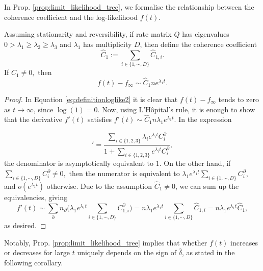 \begin{appendices}
In Prop. \ref{prop:limit_likelihood_tree},  we formalise the relationship between the coherence coefficient and the log-likelihood $f(t)$. 
 
  \begin{prop} \label{prop:limit_likelihood_tree}
Assuming stationarity and reversibility, if rate matrix $Q$ has eigenvalues $0 > \lambda_1 \geq \lambda_2 \geq \lambda_3$ and $\lambda_1$ has multiplicity $D$, then define the coherence coefficient \[\hat{C}_1 := \sum_{i \in \{1,\cdots, D\}} \hat{C}_{1,i}.\]
If $\hat{C}_1 \neq 0,$ then \[f(t) - f_\infty \sim \hat{C}_1 n e^{\lambda_1 t}.\]
\end{prop}
\begin{proof} \hfill
 \begin{sloppypar}
 In Equation \ref{eq:definitionloglike2} it is clear that $f(t) - f_\infty$ tends to zero as $t \to \infty$, since $\log(1) = 0$. Now, using L'H\^{o}pital's rule, it is enough to show that the derivative $f'(t)$ satisfies ${f'(t) \sim 
     \hat{C}_1 n \lambda_1  e^{\lambda_1 t}}$. In the expression
 \end{sloppypar}
 \begin{equation*}
     [\log \Big(1 +  \sum_{i \in \{ 1,2,3\}} e^{\lambda_i t} C_i^\partial \Big)]' = \frac{  \sum_{i \in \{ 1,2,3\}} \lambda_i e^{\lambda_it} C_i^\partial }{1 + \sum_{i \in \{ 1,2,3\}} e^{\lambda_it} C_i^\partial},
 \end{equation*}
 the denominator is asymptotically equivalent to $1$. On the other hand, if ${\sum_{i \in \{1,\cdots, D\}}C_i^\partial \neq 0,}$ then the numerator is equivalent to ${\lambda_1e^{\lambda_1t}\sum_{i \in \{1,\cdots, D\}}C_i^\partial}$, and $o(e^{\lambda_1t})$ otherwise. Due to the assumption $\hat{C}_1 \neq 0$, we can sum up the equivalencies, giving
\begin{equation}
     f'(t) \sim \sum_{\partial} n_\partial \Big(
     \lambda_1 e^{\lambda_1t}
     \sum_{i \in \{1,\cdots, D\}}
     C_{1,i}^\partial 
     \Big) = 
     n \lambda_1  e^{\lambda_1 t} \sum_{i \in \{1,\cdots, D\}} 
     \hat{C}_{1,i}= n \lambda_1  e^{\lambda_1 t} \hat{C}_1,
\end{equation}
as desired.

\end{proof}

\iffalse
Notably, Prop. \ref{prop:limit_likelihood_tree} implies that whether $f(t)$ increases or decreases for large $t$ uniquely depends on the sign of $\hat{\delta}$, as stated in the following corollary. 


\end{appendices}
